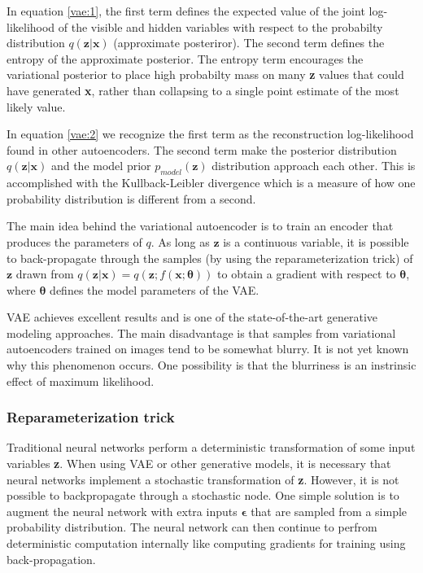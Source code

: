 In equation \ref{vae:1}, the first term defines the expected value of the joint
log-likelihood of the visible and hidden variables with respect to the
probabilty distribution $q(\textbf{z}|\textbf{x})$ (approximate posteriror). The
second term defines the entropy of the approximate posterior. The entropy term
encourages the variational posterior to place high probabilty mass on many
\textbf{z} values that could have generated \textbf{x}, rather than collapsing
to a single point estimate of the most likely value.

In equation \ref{vae:2} we recognize the first term as the reconstruction
log-likelihood found in other autoencoders. The second term make the posterior
distribution $q(\textbf{z}|\textbf{x})$ and the model prior
$p_{model}(\textbf{z})$ distribution approach each other. This is accomplished with the
Kullback-Leibler divergence which is a measure of how one probability
distribution is different from a second.

The main idea behind the variational autoencoder is to train an encoder that
produces the parameters of $q$. As long as $\textbf{z}$ is a continuous
variable, it is possible to back-propagate through the samples (by using the
reparameterization trick) of $\textbf{z}$ drawn from $q(\textbf{z}|\textbf{x}) =
q(\textbf{z};f(\textbf{x};\boldsymbol\theta))$ to obtain a gradient with respect
to $\boldsymbol\theta$, where $\boldsymbol\theta$ defines the model parameters
of the VAE.

VAE achieves excellent results and is one of the state-of-the-art generative
modeling approaches. The main disadvantage is that samples from variational
autoencoders trained on images tend to be somewhat blurry. It is not yet known
why this phenomenon occurs. One possibility is that the blurriness is an
instrinsic effect of maximum likelihood.

\subsubsection{Reparameterization trick}
Traditional neural networks perform a deterministic transformation of some input
variables \textbf{z}. When using VAE or other generative models, it is necessary
that neural networks implement a stochastic transformation of \textbf{z}.
However, it is not possible to backpropagate through a stochastic node. One
simple solution is to augment the neural network with extra inputs
$\boldsymbol\epsilon$ that are sampled from a simple probability distribution.
The neural network can then continue to perfrom deterministic computation
internally like computing gradients for training using back-propagation.

